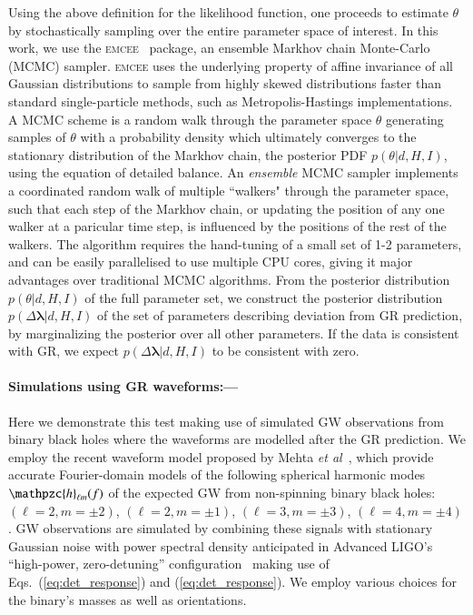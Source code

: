 \documentclass[prl,preprintnumbers,twocolumn,eqsecnum,floatfix,a4paper,nofootinbib,superscriptaddress]{revtex4}
\newcommand{\h}{\mathpzc{h}}
\newcommand{\blambda}{\bm{\lambda}}
\newcommand{\etal}{\emph{et al}}
\begin{document}
Using the above definition for the likelihood function, one proceeds to estimate $\theta$ by stochastically sampling over the entire parameter space of interest. In this work, we use the \textsc{emcee}~\cite{goodman2010ensemble,foreman2013emcee} package, an ensemble Markhov chain Monte-Carlo (MCMC) sampler. \textsc{emcee} uses the underlying property of affine invariance of all Gaussian distributions to sample from highly skewed distributions faster than standard single-particle methods, such as Metropolis-Hastings implementations. A MCMC scheme is a random walk through the parameter space $\theta$ generating samples of $\theta$ with a probability density which ultimately converges to the stationary distribution of the Markhov chain, the posterior PDF $p(\theta|d, H, I)$, using the equation of detailed balance. An \emph{ensemble} MCMC sampler implements a coordinated random walk of multiple ``walkers" through the parameter space, such that each step of the Markhov chain, or updating the position of any one walker at a paricular time step, is influenced by the positions of the rest of the walkers. %
The algorithm requires the hand-tuning of a small set of 1-2 parameters, and can be easily parallelised to use multiple CPU cores, giving it major advantages over traditional MCMC algorithms. From the posterior distribution $p(\theta|d, H, I)$ of the full parameter set, we construct the posterior distribution $p(\Delta \blambda|d, H, I)$ of the set of parameters describing deviation from GR prediction, by marginalizing the posterior over all other parameters. If the data is consistent with GR, we expect $p(\Delta \blambda|d, H, I)$ to be consistent with zero. 


\paragraph{Simulations using GR waveforms:---}
Here we demonstrate this test making use of simulated GW observations from binary black holes where the waveforms are modelled after the GR prediction. We employ the recent waveform model proposed by Mehta \etal~\cite{Mehta:2017zz}, which provide accurate Fourier-domain models of the following spherical harmonic modes $\h_{\ell m}(f)$ of the expected GW from non-spinning binary black holes: $(\ell = 2, m = \pm2)$, $(\ell = 2, m=\pm1)$, $(\ell = 3, m=\pm3)$, $(\ell = 4, m = \pm4)$. GW observations are simulated by combining these signals with stationary Gaussian noise with power spectral density anticipated in Advanced LIGO's ``high-power, zero-detuning'' configuration~\cite{aligo} making use of Eqs.~(\ref{eq:det_response}) and (\ref{eq:det_response}). We employ various choices for the binary's masses as well as orientations. 
 
\end{document}
